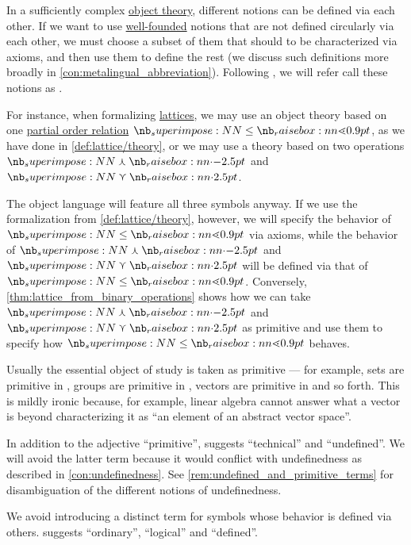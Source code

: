 \begin{concept}\label{con:primitive_notion}
  In a sufficiently complex \hyperref[con:metalogic]{object theory}, different notions can be defined via each other. If we want to use \hyperref[def:well_founded_relation]{well-founded} notions that are not defined circularly via each other, we must choose a subset of them that should to be characterized via axioms, and then use them to define the rest (we discuss such definitions more broadly in \ref{con:metalingual_abbreviation}). Following , we will refer call these notions as .

  For instance, when formalizing \hyperref[def:lattice]{lattices}, we may use an object theory based on one \hyperref[def:partially_ordered_set]{partial order relation} \( {\synleq} \), as we have done in \cref{def:lattice/theory}, or we may use a theory based on two operations \( {\synvarwedge} \) and \( {\synvarvee} \).

  The object language will feature all three symbols anyway. If we use the formalization from \cref{def:lattice/theory}, however, we will specify the behavior of \( {\synleq} \) via axioms, while the behavior of \( {\synvarwedge} \) and \( {\synvarvee} \) will be defined via that of \( {\synleq} \). Conversely, \cref{thm:lattice_from_binary_operations} shows how we can take \( {\synvarwedge} \) and \( {\synvarvee} \) as primitive and use them to specify how \( {\synleq} \) behaves.

  Usually the essential object of study is taken as primitive --- for example, sets are primitive in , groups are primitive in , vectors are primitive in  and so forth. This is mildly ironic because, for example, linear algebra cannot answer what a vector is beyond characterizing it as \enquote{an element of an abstract vector space}.
\end{concept}
\begin{comments}
  \item In addition to the adjective \enquote{primitive},  suggests \enquote{technical} and \enquote{undefined}. We will avoid the latter term because it would conflict with undefinedness as described in \cref{con:undefinedness}. See \cref{rem:undefined_and_primitive_terms} for disambiguation of the different notions of undefinedness.

  \item We avoid introducing a distinct term for symbols whose behavior is defined via others.  suggests \enquote{ordinary}, \enquote{logical} and \enquote{defined}.
\end{comments}

